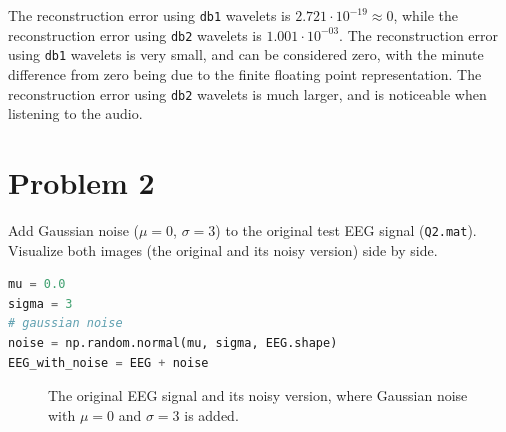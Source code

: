 The reconstruction error using \texttt{db1} wavelets is $2.721 \cdot 10^{-19} \approx 0$, while the reconstruction error using \texttt{db2} wavelets is $1.001 \cdot 10^{-03}$. The reconstruction error using \texttt{db1} wavelets is very small, and can be considered zero, with the minute difference from zero being due to the finite floating point representation. The reconstruction error using \texttt{db2} wavelets is much larger, and is noticeable when listening to the audio.


\section*{Problem 2} \label{sec:problem2}

\begin{tcolorbox}[colback=green!5!white,boxrule=0pt,frame empty]
    Add Gaussian noise ($\mu = 0$, $\sigma = 3$) to the original test
    EEG signal (\verb|Q2.mat|).
    Visualize both images (the original and its noisy version) side by side.
\end{tcolorbox}


\begin{lstlisting}[language=Python]
mu = 0.0
sigma = 3
# gaussian noise
noise = np.random.normal(mu, sigma, EEG.shape)
EEG_with_noise = EEG + noise
\end{lstlisting}


\begin{figure}[H]
    \centering
    \caption{The original EEG signal and its noisy version, where Gaussian noise with $\mu = 0$ and $\sigma = 3$ is added.}
    \label{fig:EEG_with_and_without_noise}
\end{figure}

